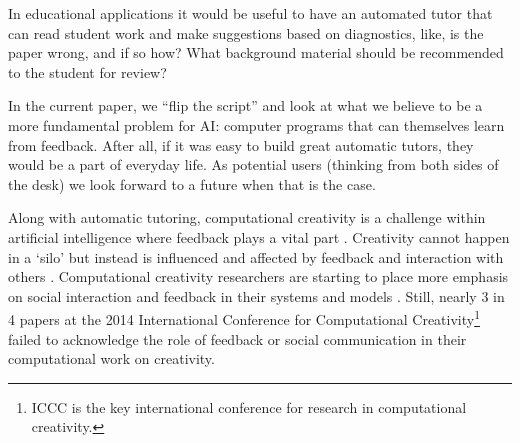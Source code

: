 %
%
%
%

%
%

In educational applications it would be useful to have an automated tutor that can read student work and make suggestions based on diagnostics, like, is the paper wrong, and if so how?  What background material should be recommended to the student for review?

In the current paper, we ``flip the script'' and look at what we believe to be a more fundamental problem for AI: computer programs that can themselves learn from feedback.  After all, if it was easy to build great automatic tutors, they would be a part of everyday life.  As potential users (thinking from both sides of the desk) we look forward to a future when that is the case.

Along with automatic tutoring, computational creativity is a challenge within artificial intelligence where feedback plays a vital part \cite<for example>{perezyperez10MM,pease10}. Creativity cannot happen in a `silo' but instead is influenced and affected by feedback and interaction with others \cite{csik88,saunders2012towards}. Computational creativity researchers are starting to place more emphasis on social interaction and feedback in their systems and models \cite{saunders2012towards,gervas2014reading,corneli15iccc}. Still, nearly 3 in 4 papers at the 2014 International Conference for Computational Creativity\footnote{ICCC is  the key international conference for research in computational creativity.} failed to acknowledge the role of feedback or social communication in their computational work on creativity. 

